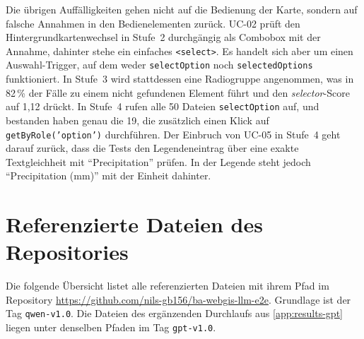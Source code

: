 Die übrigen Auffälligkeiten gehen nicht auf die Bedienung der Karte, sondern auf falsche Annahmen in den Bedienelementen zurück. UC-02 prüft den Hintergrundkartenwechsel in Stufe~2 durchgängig als Combobox mit der Annahme, dahinter stehe ein einfaches \texttt{<select>}. Es handelt sich aber um einen Auswahl-Trigger, auf dem weder \texttt{selectOption} noch \texttt{selectedOptions} funktioniert. In Stufe~3 wird stattdessen eine Radiogruppe angenommen, was in 82\,\% der Fälle zu einem nicht gefundenen Element führt und den \emph{selector}-Score auf 1,12 drückt. In Stufe~4 rufen alle 50 Dateien \texttt{selectOption} auf, und bestanden haben genau die 19, die zusätzlich einen Klick auf \texttt{getByRole('option')} durchführen. Der Einbruch von UC-05 in Stufe~4 geht darauf zurück, dass die Tests den Legendeneintrag über eine exakte Textgleichheit mit \enquote{Precipitation} prüfen. In der Legende steht jedoch \enquote{Precipitation (mm)} mit der Einheit dahinter.

\newpage

\section{Referenzierte Dateien des Repositories}
\label{app:dateien}

Die folgende Übersicht listet alle referenzierten Dateien mit ihrem Pfad im Repository \url{https://github.com/nils-gb156/ba-webgis-llm-e2e}. Grundlage ist der Tag \texttt{qwen-v1.0}. Die Dateien des ergänzenden Durchlaufs aus \ref{app:results-gpt} liegen unter denselben Pfaden im Tag \texttt{gpt-v1.0}.

